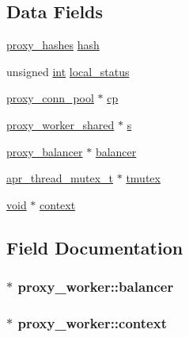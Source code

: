 \subsection*{Data Fields}
\begin{DoxyCompactItemize}
\item 
\hyperlink{structproxy__hashes}{proxy\+\_\+hashes} \hyperlink{structproxy__worker_aeb87335d8fe0fd672be44b1e51c425ad}{hash}
\item 
unsigned \hyperlink{pcre_8txt_a42dfa4ff673c82d8efe7144098fbc198}{int} \hyperlink{structproxy__worker_a1b27e893cb365cbce9f37f9dac69e144}{local\+\_\+status}
\item 
\hyperlink{structproxy__conn__pool}{proxy\+\_\+conn\+\_\+pool} $\ast$ \hyperlink{structproxy__worker_aa3b1761756ad260fc52589501c9f6fe0}{cp}
\item 
\hyperlink{structproxy__worker__shared}{proxy\+\_\+worker\+\_\+shared} $\ast$ \hyperlink{structproxy__worker_abeaebad014908a4f108fba27313187aa}{s}
\item 
\hyperlink{structproxy__balancer}{proxy\+\_\+balancer} $\ast$ \hyperlink{structproxy__worker_a749abf888f09eddf658f957c43f6620d}{balancer}
\item 
\hyperlink{structapr__thread__mutex__t}{apr\+\_\+thread\+\_\+mutex\+\_\+t} $\ast$ \hyperlink{structproxy__worker_a5920bfc1c36a8af7f19f2e9cab91a373}{tmutex}
\item 
\hyperlink{group__MOD__ISAPI_gacd6cdbf73df3d9eed42fa493d9b621a6}{void} $\ast$ \hyperlink{structproxy__worker_ad438f3602c6343c87f26556d547a7f4c}{context}
\end{DoxyCompactItemize}


\subsection{Field Documentation}
\subsubsection[{\texorpdfstring{balancer}{balancer}}]{$\ast$ proxy\+\_\+worker\+::balancer}\hypertarget{structproxy__worker_a749abf888f09eddf658f957c43f6620d}{}\label{structproxy__worker_a749abf888f09eddf658f957c43f6620d}
\subsubsection[{\texorpdfstring{context}{context}}]{$\ast$ proxy\+\_\+worker\+::context}\hypertarget{structproxy__worker_ad438f3602c6343c87f26556d547a7f4c}{}\label{structproxy__worker_ad438f3602c6343c87f26556d547a7f4c}
